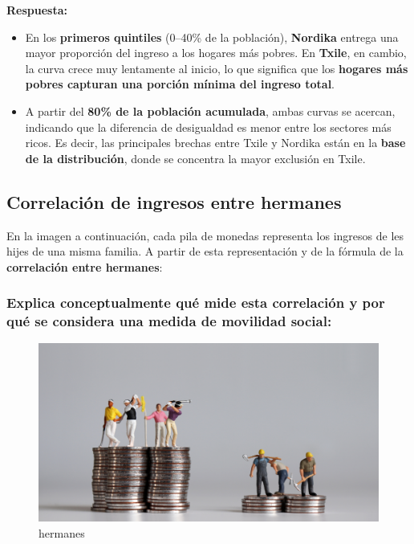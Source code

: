 \documentclass[
]{article}
\begin{document}
\textbf{Respuesta:}

\begin{itemize}
\item
  En los \textbf{primeros quintiles} (0--40\% de la población),
  \textbf{Nordika} entrega una mayor proporción del ingreso a los
  hogares más pobres. En \textbf{Txile}, en cambio, la curva crece muy
  lentamente al inicio, lo que significa que los \textbf{hogares más
  pobres capturan una porción mínima del ingreso total}.
\item
  A partir del \textbf{80\% de la población acumulada}, ambas curvas se
  acercan, indicando que la diferencia de desigualdad es menor entre los
  sectores más ricos. Es decir, las principales brechas entre Txile y
  Nordika están en la \textbf{base de la distribución}, donde se
  concentra la mayor exclusión en Txile.
\end{itemize}

\subsection{Correlación de ingresos entre
hermanes}\label{correlaciuxf3n-de-ingresos-entre-hermanes}

En la imagen a continuación, cada pila de monedas representa los
ingresos de les hijes de una misma familia. A partir de esta
representación y de la fórmula de la \textbf{correlación entre
hermanes}:

\subsubsection{Explica conceptualmente qué mide esta correlación y por
qué se considera una medida de movilidad
social:}\label{explica-conceptualmente-quuxe9-mide-esta-correlaciuxf3n-y-por-quuxe9-se-considera-una-medida-de-movilidad-social}

\begin{figure}[H]

{\centering \includegraphics{exam_answers_files/mediabag/Rich-vs-Poor.png}

}

\caption{hermanes}

\end{figure}%
\end{document}
